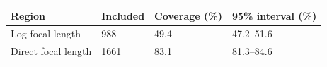 \begin{tabular}{llll}
\hline
Region & Included & Coverage (\%) & 95\% interval (\%) \\
\hline
Log focal length & 988 & 49.4 & 47.2–51.6 \\
Direct focal length & 1661 & 83.1 & 81.3–84.6 \\
\hline
\end{tabular}
